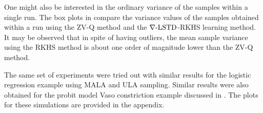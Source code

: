 One might also be interested in the ordinary variance of the samples within a single run. The box plots in  compare the variance values of the samples obtained within a run using the ZV-Q method and the $\nabla\text{-LSTD}$-RKHS learning method. It may be observed that in spite of having outliers, the mean sample variance using the RKHS method is about one order of magnitude lower than the ZV-Q method.

The same set of experiments were tried out with similar results for the logistic regression example using MALA and ULA sampling. Similar results were also obtained for the probit model Vaso constriction example discussed in \cite{papmirgir14}. The plots for these simulations are provided in the appendix. 

\begin{figure}[htbp]
	\centering
	\mbox{
	}
	\mbox{
}
\end{figure}
